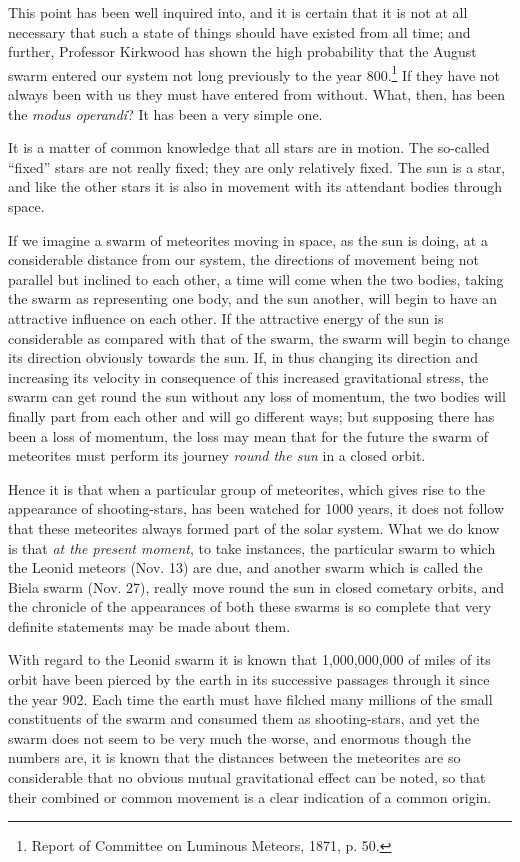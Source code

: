 \documentclass[a4paper, 12pt, oneside, polutonikogreek, english]{article}
\begin{document}
This point has been well inquired into, and it is certain that it is not at all necessary that such a state of things should have existed from all time; and further, Professor Kirkwood has shown the high probability that the August swarm entered our system not long previously to the year 800.\footnote{Report of Committee on Luminous Meteors, 1871, p. 50.} If they have not always been with us they must have entered from without. What, then, has been the \emph{modus operandi}? It has been a very simple one.

It is a matter of common knowledge that all stars are in motion. The so-called ``fixed'' stars are not really fixed; they are only relatively fixed. The sun is a star, and like the other stars it is also in movement with its attendant bodies through space.

If we imagine a swarm of meteorites moving in space, as the sun is doing, at a considerable distance from our system, the directions of movement being not parallel but inclined to each other, a time will come when the two bodies, taking the swarm as representing one body, and the sun another, will begin to have an attractive influence on each other. If the attractive energy of the sun is considerable as compared with that of the swarm, the swarm will begin to change its direction obviously towards the sun. If, in thus changing its direction and increasing its velocity in consequence of this increased gravitational stress, the swarm can get round the sun without any loss of momentum, the two bodies will finally part from each other and will go different ways; but supposing there has been a loss of momentum, the loss may mean that for the future the swarm of meteorites must perform its journey \emph{round the sun} in a closed orbit.

Hence it is that when a particular group of meteorites, which gives rise to the appearance of shooting-stars, has been watched for 1000 years, it does not follow that these meteorites always formed part of the solar system. What we do know is that \emph{at the present moment}, to take instances, the particular swarm to which the Leonid meteors (Nov. 13) are due, and another swarm which is called the Biela swarm (Nov. 27), really move round the sun in closed cometary orbits, and the chronicle of the appearances of both these swarms is so complete that very definite statements may be made about them.

With regard to the Leonid swarm it is known that 1,000,000,000 of miles of its orbit have been pierced by the earth in its successive passages through it since the year 902. Each time the earth must have filched many millions of the small constituents of the swarm and consumed them as shooting-stars, and yet the swarm does not seem to be very much the worse, and enormous though the numbers are, it is known that the distances between the meteorites are so considerable that no obvious mutual gravitational effect can be noted, so that their combined or common movement is a clear indication of a common origin.
\end{document}
